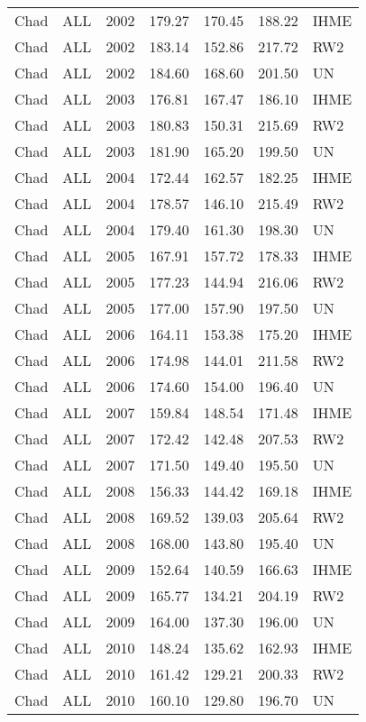 \begin{longtable}{lllrrrl}
  Chad & ALL & 2002 & 179.27 & 170.45 & 188.22 & IHME \\ 
  Chad & ALL & 2002 & 183.14 & 152.86 & 217.72 & RW2 \\ 
  Chad & ALL & 2002 & 184.60 & 168.60 & 201.50 & UN \\ 
  Chad & ALL & 2003 & 176.81 & 167.47 & 186.10 & IHME \\ 
  Chad & ALL & 2003 & 180.83 & 150.31 & 215.69 & RW2 \\ 
  Chad & ALL & 2003 & 181.90 & 165.20 & 199.50 & UN \\ 
  Chad & ALL & 2004 & 172.44 & 162.57 & 182.25 & IHME \\ 
  Chad & ALL & 2004 & 178.57 & 146.10 & 215.49 & RW2 \\ 
  Chad & ALL & 2004 & 179.40 & 161.30 & 198.30 & UN \\ 
  Chad & ALL & 2005 & 167.91 & 157.72 & 178.33 & IHME \\ 
  Chad & ALL & 2005 & 177.23 & 144.94 & 216.06 & RW2 \\ 
  Chad & ALL & 2005 & 177.00 & 157.90 & 197.50 & UN \\ 
  Chad & ALL & 2006 & 164.11 & 153.38 & 175.20 & IHME \\ 
  Chad & ALL & 2006 & 174.98 & 144.01 & 211.58 & RW2 \\ 
  Chad & ALL & 2006 & 174.60 & 154.00 & 196.40 & UN \\ 
  Chad & ALL & 2007 & 159.84 & 148.54 & 171.48 & IHME \\ 
  Chad & ALL & 2007 & 172.42 & 142.48 & 207.53 & RW2 \\ 
  Chad & ALL & 2007 & 171.50 & 149.40 & 195.50 & UN \\ 
  Chad & ALL & 2008 & 156.33 & 144.42 & 169.18 & IHME \\ 
  Chad & ALL & 2008 & 169.52 & 139.03 & 205.64 & RW2 \\ 
  Chad & ALL & 2008 & 168.00 & 143.80 & 195.40 & UN \\ 
  Chad & ALL & 2009 & 152.64 & 140.59 & 166.63 & IHME \\ 
  Chad & ALL & 2009 & 165.77 & 134.21 & 204.19 & RW2 \\ 
  Chad & ALL & 2009 & 164.00 & 137.30 & 196.00 & UN \\ 
  Chad & ALL & 2010 & 148.24 & 135.62 & 162.93 & IHME \\ 
  Chad & ALL & 2010 & 161.42 & 129.21 & 200.33 & RW2 \\ 
  Chad & ALL & 2010 & 160.10 & 129.80 & 196.70 & UN \\ 

\end{longtable}
